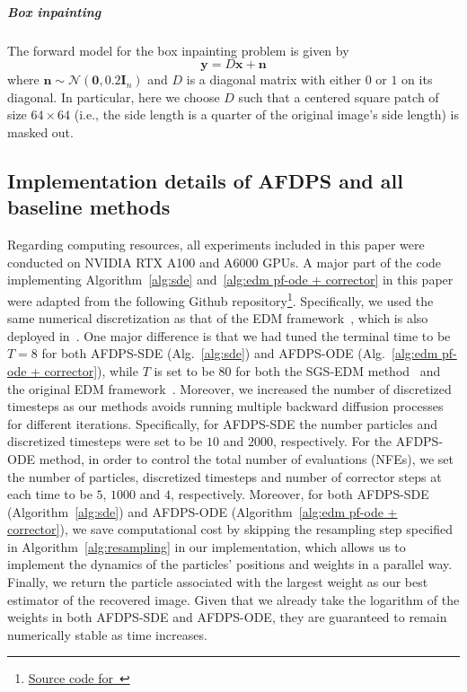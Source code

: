 \documentclass{article}
\numberwithin{equation}{section}
\def\vzero{{\bm{0}}}
\def\vn{{\bm{n}}}
\def\vx{{\bm{x}}}
\def\vy{{\bm{y}}}
\def\mI{{\bm{I}}}
\def\gN{{\mathcal{N}}}
\begin{document}
\subparagraph{Box inpainting} The forward model for the box inpainting problem is given by 
$$\vy = D \vx +\vn$$
where $\vn \sim \gN(\vzero, 0.2 \mI_{n})$ and $D$ is a diagonal matrix with either $0$ or $1$ on its diagonal. In particular, here we choose $D$ such that a centered square patch of size $64 \times 64$ (i.e., the side length is a quarter of the original image's side length) is masked out. 


\subsection{Implementation details of AFDPS and all baseline methods}
Regarding computing resources, all experiments included in this paper were conducted on NVIDIA RTX A100 and A6000 GPUs. A major part of the code implementing Algorithm~\ref{alg:sde} and~\ref{alg:edm pf-ode + corrector} in this paper were adapted from the following Github repository\footnote{\href{https://github.com/zihuiwu/PnP-DM-public}{Source code for~\cite{wu2024principled}}}. Specifically, we used the same numerical discretization as that of the EDM framework~\cite{karras2019style}, which is also deployed in~\cite{wu2024principled}. One major difference is that we had tuned the terminal time to be $T=8$ for both AFDPS-SDE (Alg.~\ref{alg:sde}) and AFDPS-ODE (Alg.~\ref{alg:edm pf-ode + corrector}), while $T$ is set to be $80$ for both the SGS-EDM method~\cite{wu2024principled} and the original EDM framework~\cite{karras2022elucidating}. Moreover, we increased the number of discretized timesteps as our methods avoids running multiple backward diffusion processes for different iterations. Specifically, for AFDPS-SDE the number particles and discretized timesteps were set to be $10$ and $2000$, respectively. For the AFDPS-ODE method, in order to control the total number of evaluations (NFEs), we set the number of particles, discretized timesteps and number of corrector steps at each time to be $5$, $1000$ and $4$, respectively. Moreover, for both AFDPS-SDE (Algorithm~\ref{alg:sde}) and AFDPS-ODE (Algorithm~\ref{alg:edm pf-ode + corrector}), we save computational cost by skipping the resampling step specified in Algorithm~\ref{alg:resampling} in our implementation, which allows us to implement the dynamics of the particles' positions and weights in a parallel way. Finally, we return the particle associated with the largest weight as our best estimator of the recovered image. Given that we already take the logarithm of the weights in both AFDPS-SDE and AFDPS-ODE, they are guaranteed to remain numerically stable as time increases. 
\end{document}
